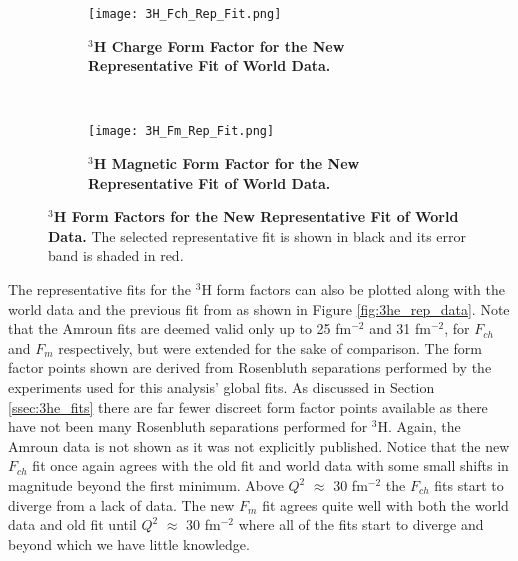 \begin{figure}[!ht]
\begin{subfigure}{1.\textwidth}
  \centering
  \texttt{[image: 3H\_Fch\_Rep\_Fit.png]}
  \caption{\bf{$^3$H Charge Form Factor for the New Representative Fit of World Data.}}
  \label{fig:3h_fch_rep_fit}
\end{subfigure}\\
\begin{subfigure}{1.\textwidth}
  \centering
  \texttt{[image: 3H\_Fm\_Rep\_Fit.png]}
  \caption{\bf{$^3$H Magnetic Form Factor for the New Representative Fit of World Data.}}
  \label{fig:3h_fm_rep_fit}
\end{subfigure}
\caption[$^3$H Form Factors for the New Representative Fit of World Data] {
{\bf{$^3$H Form Factors for the New Representative Fit of World Data.}} The selected representative fit is shown in black and its error band is shaded in red.}
\label{fig:3h_rep_fit}
\end{figure}

The representative fits for the $^3$H form factors can also be plotted along with the world data and the previous fit from \cite{Article:Amroun} as shown in Figure \ref{fig:3he_rep_data}. Note that the Amroun fits are deemed valid only up to 25 fm$^{-2}$ and 31 fm$^{-2}$, for $F_{ch}$ and $F_m$ respectively, but were extended for the sake of comparison. The form factor points shown are derived from Rosenbluth separations performed by the experiments used for this analysis' global fits. As discussed in Section \ref{ssec:3he_fits} there are far fewer discreet form factor points available as there have not been many Rosenbluth separations performed for $^3$H. Again, the Amroun data is not shown as it was not explicitly published. Notice that the new $F_{ch}$ fit once again agrees with the old fit and world data with some small shifts in magnitude beyond the first minimum. Above $Q^2$ $\approx$ 30 fm$^{-2}$ the $F_{ch}$ fits start to diverge from a lack of data. The new $F_m$ fit agrees quite well with both the world data and old fit until $Q^2$ $\approx$ 30 fm$^{-2}$ where all of the fits start to diverge and beyond which we have little knowledge. 

